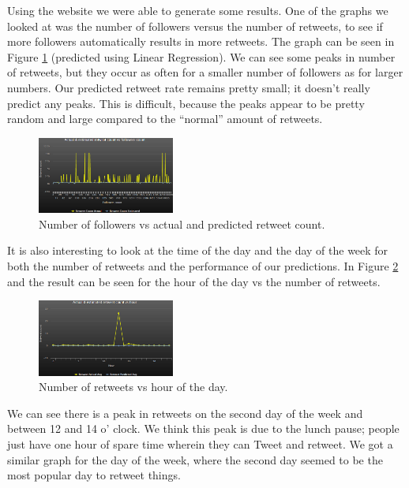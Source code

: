 \documentclass[10pt]{IEEEtran}
\begin{document}
Using the website we were able to generate some results. One of the graphs we looked at was the number of followers versus the number of retweets, to see if more followers automatically results in more retweets. The graph can be seen in Figure \ref{result1} (predicted using Linear Regression). We can see some peaks in number of retweets, but they occur as often for a smaller number of followers as for larger numbers. Our predicted retweet rate remains pretty small; it doesn't really predict any peaks. This is difficult, because the peaks appear to be pretty random and large compared to the ``normal'' amount of retweets. 

\begin{figure}[h!]
\begin{center}
\includegraphics[width=0.4\textwidth]{images/giving_tuesday_linear_regression_followers_vs_retweet}
\caption{Number of followers vs actual and predicted retweet count. \label{result1}}
\end{center}
\end{figure}

It is also interesting to look at the time of the day and the day of the week for both the number of retweets and the performance of our predictions. In Figure \ref{result2} and the result can be seen for the hour of the day vs the number of retweets. 

\begin{figure}[h!]
\begin{center}
\includegraphics[width=0.4\textwidth]{images/srnn_hour_vs_retweet}
\caption{Number of retweets vs hour of the day. \label{result2}}
\end{center}
\end{figure}

We can see there is a peak in retweets on the second day of the week and between 12 and 14 o' clock. We think this peak is due to the lunch pause; people just have one hour of spare time wherein they can Tweet and retweet. We got a similar graph for the day of the week, where the second day seemed to be the most popular day to retweet things.
\end{document}
